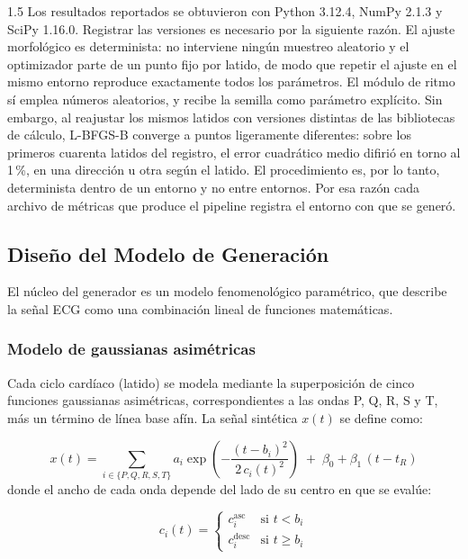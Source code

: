 \begin{spacing}{1.5}
Los resultados reportados se obtuvieron con Python 3.12.4, NumPy 2.1.3 y SciPy 1.16.0. Registrar las versiones es necesario por la siguiente razón. El ajuste morfológico es determinista: no interviene ningún muestreo aleatorio y el optimizador parte de un punto fijo por latido, de modo que repetir el ajuste en el mismo entorno reproduce exactamente todos los parámetros. El módulo de ritmo sí emplea números aleatorios, y recibe la semilla como parámetro explícito. Sin embargo, al reajustar los mismos latidos con versiones distintas de las bibliotecas de cálculo, L-BFGS-B converge a puntos ligeramente diferentes: sobre los primeros cuarenta latidos del registro, el error cuadrático medio difirió en torno al 1\,\%, en una dirección u otra según el latido. El procedimiento es, por lo tanto, determinista dentro de un entorno y no entre entornos. Por esa razón cada archivo de métricas que produce el pipeline registra el entorno con que se generó.

\subsection{Diseño del Modelo de Generación}

El núcleo del generador es un modelo fenomenológico paramétrico, que describe la señal ECG como una combinación lineal de funciones matemáticas.

\subsubsection{Modelo de gaussianas asimétricas}

Cada ciclo cardíaco (latido) se modela mediante la superposición de cinco funciones gaussianas asimétricas, correspondientes a las ondas P, Q, R, S y T, más un término de línea base afín. La señal sintética $x(t)$ se define como:

\begin{equation}
    x(t) = \sum_{i \in \{P,Q,R,S,T\}} a_i \exp\!\left( -\frac{(t - b_i)^2}{2\,c_i(t)^2} \right) \;+\; \beta_0 + \beta_1\,(t - t_R)
\end{equation}
donde el ancho de cada onda depende del lado de su centro en que se evalúe:

\begin{equation}
    c_i(t) =
    \begin{cases}
        c_i^{\text{asc}} & \text{si } t < b_i \\[2pt]
        c_i^{\text{desc}} & \text{si } t \geq b_i
    \end{cases}
\end{equation}


\end{spacing}

